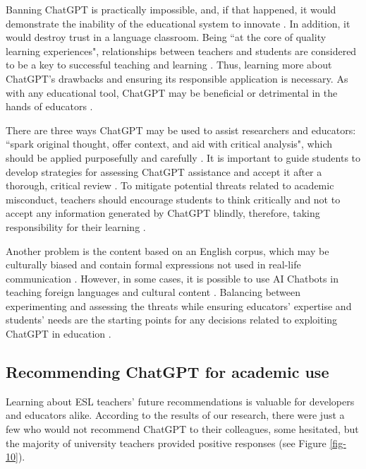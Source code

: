 \documentclass[english]{textolivre}
\begin{document}
Banning ChatGPT is practically impossible, and, if that happened, it would demonstrate the inability of the educational system to innovate \cite{hie2023}. In addition, it would destroy trust in a language classroom. Being ``at the core of quality learning experiences", relationships between teachers and students are considered to be a key to successful teaching and learning \cite[p. 26]{farrell2015}. Thus, learning more about ChatGPT’s drawbacks and ensuring its responsible application is necessary. As with any educational tool, ChatGPT may be beneficial or detrimental in the hands of educators \cite{hie2023}.

There are three ways ChatGPT may be used to assist researchers and educators: ``spark original thought, offer context, and aid with critical analysis", which should be applied purposefully and carefully \cite{dalalah2023}. It is important to guide students to develop strategies for assessing ChatGPT assistance and accept it after a thorough, critical review \cite[p. 9]{xiao2023}. To mitigate potential threats related to academic misconduct, teachers should encourage students to think critically and not to accept any information generated by ChatGPT blindly, therefore, taking responsibility for their learning \cite{pavlik2023}.

Another problem is the content based on an English corpus, which may be culturally biased and contain formal expressions not used in real-life communication \cite[p. 545]{kohnke2023}. However, in some cases, it is possible to use AI Chatbots in teaching foreign languages and cultural content \cite[p. 14]{mageira2022}. Balancing between experimenting and assessing the threats while ensuring educators’ expertise and students’ needs are the starting points for any decisions related to exploiting ChatGPT in education \cite[p. 14]{kostka2023}.

\subsection{Recommending ChatGPT for academic use}
Learning about ESL teachers’ future recommendations is valuable for developers and educators alike. According to the results of our research, there were just a few who would not recommend ChatGPT to their colleagues, some hesitated, but the majority of university teachers provided positive responses (see Figure \ref{fig-10}).
\end{document}
